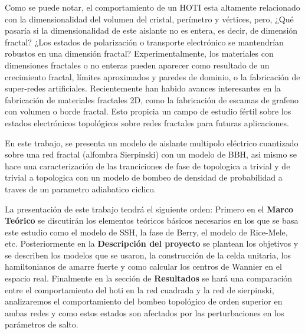 Como se puede notar, el comportamiento de un HOTI esta altamente relacionado con la dimensionalidad del volumen del cristal, perímetro y vértices, pero, ¿Qué pasaría si la dimensionalidad de este aislante no es entera, es decir, de dimensión fractal? ¿Los estados de polarización o transporte electrónico se mantendrían robustos en una dimensión fractal? Experimentalmente, los materiales con dimensiones fractales o no enteras pueden aparecer como resultado de un crecimiento fractal, límites aproximados y paredes de dominio, o la fabricación de super-redes artificiales. Recientemente han habido avances interesantes en la fabricación de materiales fractales 2D, como la fabricación de escamas de grafeno con volumen o borde fractal. Esto propicia un campo de estudio fértil sobre los estados electrónicos topológicos sobre redes fractales para futuras aplicaciones.

En este trabajo, se presenta un modelo de aislante multipolo eléctrico cuantizado sobre una red fractal (alfombra Sierpinski) con un modelo de BBH, asi mismo se hace una caracterización de las tranciciones de fase de topologica a trivial y de trivial a topologica con un modelo de bombeo de densidad de probabilidad a traves de un parametro adiabatico ciclico.



La presentación de este trabajo tendrá el siguiente orden: Primero en el \textbf{Marco Teórico} se discutirán los elementos teóricos básicos necesarios en los que se basa este estudio como el modelo de SSH, la fase de Berry, el modelo de Rice-Mele, etc. Posteriormente en la \textbf{Descripción del proyecto} se plantean los objetivos y se describen los modelos que se usaron, la construcción de la celda unitaria, los hamiltonianos de amarre fuerte y como calcular los centros de Wannier en el espacio real. Finalmente en la sección de \textbf{Resultados} se hará una comparación entre el comportamiento del hoti en la red cuadrada y la red de sierpinski, analizaremos el comportamiento del bombeo topológico de orden superior en ambas redes y como estos estados son afectados por las perturbaciones en los parámetros de salto.

